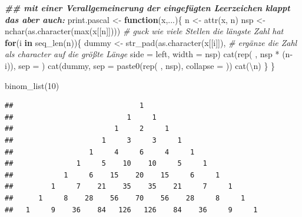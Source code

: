 \documentclass[
]{book}
\newenvironment{Shaded}{\begin{snugshade}}{\end{snugshade}}
\newcommand{\AttributeTok}[1]{\textcolor[rgb]{0.77,0.63,0.00}{#1}}
\newcommand{\CommentTok}[1]{\textcolor[rgb]{0.56,0.35,0.01}{\textit{#1}}}
\newcommand{\ControlFlowTok}[1]{\textcolor[rgb]{0.13,0.29,0.53}{\textbf{#1}}}
\newcommand{\DecValTok}[1]{\textcolor[rgb]{0.00,0.00,0.81}{#1}}
\newcommand{\DocumentationTok}[1]{\textcolor[rgb]{0.56,0.35,0.01}{\textbf{\textit{#1}}}}
\newcommand{\FunctionTok}[1]{\textcolor[rgb]{0.00,0.00,0.00}{#1}}
\newcommand{\NormalTok}[1]{#1}
\newcommand{\OtherTok}[1]{\textcolor[rgb]{0.56,0.35,0.01}{#1}}
\newcommand{\SpecialCharTok}[1]{\textcolor[rgb]{0.00,0.00,0.00}{#1}}
\newcommand{\StringTok}[1]{\textcolor[rgb]{0.31,0.60,0.02}{#1}}
\begin{document}
\begin{Shaded}
\begin{Highlighting}[]
\DocumentationTok{\#\# mit einer Verallgemeinerung der eingefügten Leerzeichen klappt das aber auch:}
\NormalTok{print.pascal }\OtherTok{\textless{}{-}} \ControlFlowTok{function}\NormalTok{(x,...)\{}
\NormalTok{  n }\OtherTok{\textless{}{-}} \FunctionTok{attr}\NormalTok{(x, }\StringTok{\textquotesingle{}n\textquotesingle{}}\NormalTok{)}
\NormalTok{  nsp }\OtherTok{\textless{}{-}} \FunctionTok{nchar}\NormalTok{(}\FunctionTok{as.character}\NormalTok{(}\FunctionTok{max}\NormalTok{(x[[n]]))) }\CommentTok{\# guck wie viele Stellen die längste Zahl hat}
  \ControlFlowTok{for}\NormalTok{(i }\ControlFlowTok{in} \FunctionTok{seq\_len}\NormalTok{(n))\{}
\NormalTok{    dummy }\OtherTok{\textless{}{-}} \FunctionTok{str\_pad}\NormalTok{(}\FunctionTok{as.character}\NormalTok{(x[[i]]), }\CommentTok{\# ergänze die Zahl als character auf die größte Länge}
                     \AttributeTok{side =} \StringTok{\textquotesingle{}left\textquotesingle{}}\NormalTok{, }
                     \AttributeTok{width =}\NormalTok{ nsp)}
    \FunctionTok{cat}\NormalTok{(}\FunctionTok{rep}\NormalTok{(}\StringTok{\textquotesingle{} \textquotesingle{}}\NormalTok{, nsp }\SpecialCharTok{*}\NormalTok{ (n}\SpecialCharTok{{-}}\NormalTok{i)), }\AttributeTok{sep =} \StringTok{\textquotesingle{}\textquotesingle{}}\NormalTok{)}
    \FunctionTok{cat}\NormalTok{(dummy, }\AttributeTok{sep =} \FunctionTok{paste0}\NormalTok{(}\FunctionTok{rep}\NormalTok{(}\StringTok{\textquotesingle{} \textquotesingle{}}\NormalTok{, nsp), }\AttributeTok{collapse =} \StringTok{\textquotesingle{}\textquotesingle{}}\NormalTok{))}
    \FunctionTok{cat}\NormalTok{(}\StringTok{\textquotesingle{}}\SpecialCharTok{\textbackslash{}n}\StringTok{\textquotesingle{}}\NormalTok{)}
\NormalTok{  \}}
\NormalTok{\}}

\FunctionTok{binom\_list}\NormalTok{(}\DecValTok{10}\NormalTok{)}
\end{Highlighting}
\end{Shaded}

\begin{verbatim}
##                              1
##                           1     1
##                        1     2     1
##                     1     3     3     1
##                  1     4     6     4     1
##               1     5    10    10     5     1
##            1     6    15    20    15     6     1
##         1     7    21    35    35    21     7     1
##      1     8    28    56    70    56    28     8     1
##   1     9    36    84   126   126    84    36     9     1
\end{verbatim}
\end{document}
